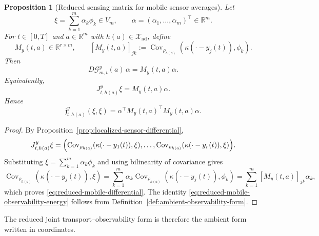 \documentclass{article}
\newtheorem{proposition}[theorem]{Proposition}
\theoremstyle{definition}
\begin{document}
\begin{proposition}[Reduced sensing matrix for mobile sensor averages]
    \label{prop:reduced-mobile-sensing-matrix}
    Let
    \[
        \xi=\sum_{k=1}^m \alpha_k\phi_k \in V_m,
        \qquad
        \alpha=(\alpha_1,\dots,\alpha_m)^\top\in \mathbb R^m.
    \]
    For \(t\in[0,T]\) and \(a\in\mathbb R^m\) with \(h(a)\in\mathcal X_{\mathrm{ad}}\), define
    \begin{equation}
        \label{eq:reduced-mobile-sensing-matrix}
        M_y(t,a)\in\mathbb R^{r\times m},
        \qquad
        [M_y(t,a)]_{jk}
        :=
        \operatorname{Cov}_{\rho_{h(a)}}(\kappa(\cdot-y_j(t)),\phi_k).
    \end{equation}
    Then
    \begin{equation}
        \label{eq:reduced-mobile-differential}
        D\mathcal G_{m,t}^{y}(a)\,\alpha
        =
        M_y(t,a)\alpha.
    \end{equation}
    Equivalently,
    \[
        J_{t,h(a)}^y\xi=M_y(t,a)\alpha.
    \]
    Hence
    \begin{equation}
        \label{eq:reduced-mobile-observability-energy}
        \mathfrak j_{t,h(a)}^{y}(\xi,\xi)
        =
        \alpha^\top M_y(t,a)^\top M_y(t,a)\alpha.
    \end{equation}
\end{proposition}

\begin{proof}
    By Proposition~\ref{prop:localized-sensor-differential},
    \[
        J_{t,h(a)}^y\xi
        =
        \Bigl(
        \operatorname{Cov}_{\rho_{h(a)}}(\kappa(\cdot-y_1(t)),\xi),\dots,
        \operatorname{Cov}_{\rho_{h(a)}}(\kappa(\cdot-y_r(t)),\xi)
        \Bigr).
    \]
    Substituting \(\xi=\sum_{k=1}^m \alpha_k\phi_k\) and using bilinearity of covariance gives
    \[
        \operatorname{Cov}_{\rho_{h(a)}}(\kappa(\cdot-y_j(t)),\xi)
        =
        \sum_{k=1}^m \alpha_k
        \operatorname{Cov}_{\rho_{h(a)}}(\kappa(\cdot-y_j(t)),\phi_k)
        =
        \sum_{k=1}^m [M_y(t,a)]_{jk}\alpha_k,
    \]
    which proves \eqref{eq:reduced-mobile-differential}. The identity
    \eqref{eq:reduced-mobile-observability-energy} follows from
    Definition~\ref{def:ambient-observability-form}.
\end{proof}

The reduced joint transport--observability form is therefore the ambient form written in
coordinates.
\end{document}

